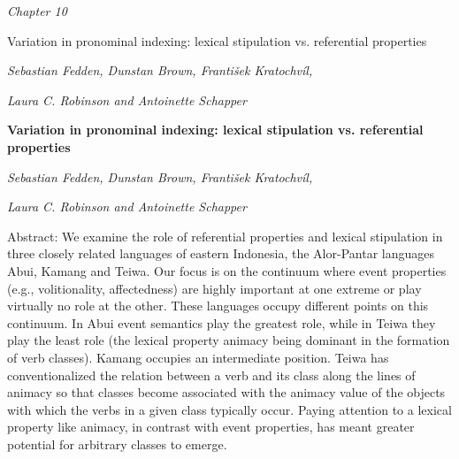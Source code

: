
\clearpage\setcounter{page}{1}\pagestyle{Standard}
{\centering\itshape
Chapter 10
\par}

{\centering
Variation in pronominal indexing: lexical stipulation vs. referential properties
\par}

{\centering\itshape
Sebastian Fedden, Dunstan Brown, Franti\v{s}ek Kratochv\'il, 
\par}

{\centering\itshape
Laura C. Robinson and Antoinette Schapper
\par}


{\centering\bfseries
Variation in pronominal indexing: lexical stipulation vs. referential properties
\par}

{\centering\itshape
Sebastian Fedden, Dunstan Brown, Franti\v{s}ek Kratochv\'il, 
\par}

{\centering\itshape
Laura C. Robinson and Antoinette Schapper
\par}

Abstract: We examine the role of referential properties and lexical stipulation in three closely related languages of eastern Indonesia, the Alor-Pantar languages Abui, Kamang and Teiwa. Our focus is on the continuum where event properties (e.g., volitionality, affectedness) are highly important at one extreme or play virtually no role at the other. These languages occupy different points on this continuum. In Abui event semantics play the greatest role, while in Teiwa they play the least role (the lexical property animacy being dominant in the formation of verb classes). Kamang occupies an intermediate position. Teiwa has conventionalized the relation between a verb and its class along the lines of animacy so that classes become associated with the animacy value of the objects with which the verbs in a given class typically occur. Paying attention to a lexical property like animacy, in contrast with event properties, has meant greater potential for arbitrary classes to emerge.

